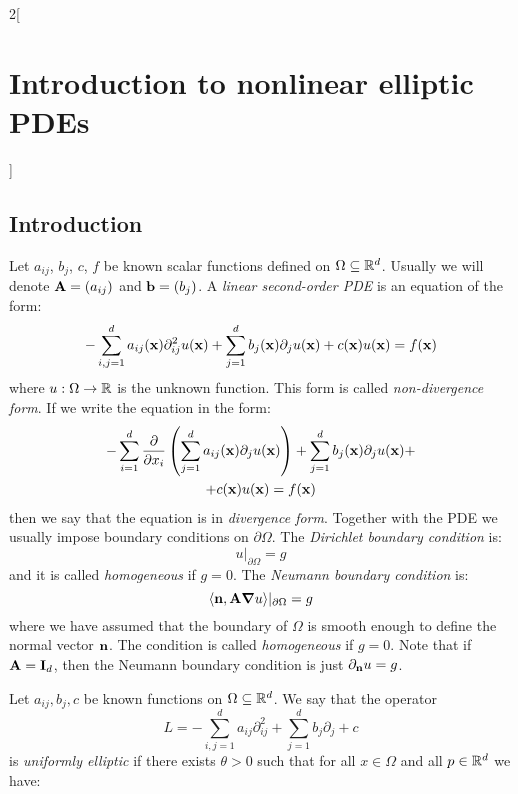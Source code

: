 \documentclass[../../../main_math.tex]{subfiles}
\begin{document}
\begin{multicols}{2}[\section{Introduction to nonlinear elliptic PDEs}]
  \subsection{Introduction}
  \begin{definition}
    Let $a_{ij}$, $b_j$, $c$, $f$ be known scalar functions defined on $\Omega\subseteq \mathbb{R}^d$. Usually we will denote $\boldsymbol{\mathrm{A}}=(a_{ij})$ and $\boldsymbol{\mathrm{b}}=(b_j)$. A \emph{linear second-order PDE} is an equation of the form:
    \begin{equation*}
      -\sum_{i,j=1}^da_{ij}(\boldsymbol{\mathrm{x}})\partial_{ij}^2u(\boldsymbol{\mathrm{x}})+\sum_{j=1}^db_j(\boldsymbol{\mathrm{x}})\partial_ju(\boldsymbol{\mathrm{x}})+c(\boldsymbol{\mathrm{x}})u(\boldsymbol{\mathrm{x}})=f(\boldsymbol{\mathrm{x}})
    \end{equation*}
    where $u:\Omega\to \mathbb{R}$ is the unknown function. This form is called \emph{non-divergence form}. If we write the equation in the form:
    \begin{multline*}
      -\sum_{i=1}^d\pdv{}{x_i}\left(\sum_{j=1}^da_{ij}(\boldsymbol{\mathrm{x}})\partial_ju(\boldsymbol{\mathrm{x}})\right)+\sum_{j=1}^db_j(\boldsymbol{\mathrm{x}})\partial_ju(\boldsymbol{\mathrm{x}})+\\+c(\boldsymbol{\mathrm{x}})u(\boldsymbol{\mathrm{x}})=f(\boldsymbol{\mathrm{x}})
    \end{multline*}
    then we say that the equation is in \emph{divergence form}. Together with the PDE we usually impose boundary conditions on $\partial\Omega$. The \emph{Dirichlet boundary condition} is:
    $$
      u|_{\partial\Omega}=g
    $$
    and it is called \emph{homogeneous} if $g=0$. The \emph{Neumann boundary condition} is:
    $$
      \langle \boldsymbol{\mathrm{n}},\boldsymbol{\mathrm{A}} \grad u\rangle|_{\partial\Omega}=g
    $$
    where we have assumed that the boundary of $\Omega$ is smooth enough to define the normal vector $\boldsymbol{\mathrm{n}}$. The condition is called \emph{homogeneous} if $g=0$. Note that if $\boldsymbol{\mathrm{A}}=\boldsymbol{\mathrm{I}}_d$, then the Neumann boundary condition is just $\partial_{\boldsymbol{\mathrm{n}}} u=g$.
  \end{definition}
  \begin{definition}
    Let $a_{ij},b_j,c$ be known functions on $\Omega\subseteq \mathbb{R}^d$. We say that the operator $$L=-\sum_{i,j=1}^da_{ij}\partial_{ij}^2 + \sum_{j=1}^d b_j\partial_j+c$$ is \emph{uniformly elliptic} if there exists $\theta>0$ such that for all $x\in \Omega$ and all $p\in \mathbb{R}^d$ we have:
    \begin{equation}

\end{equation}
\end{definition}
\end{multicols}
\end{document}

